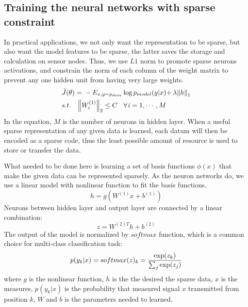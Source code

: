 \subsection{Training the neural networks with sparse constraint}
In practical applications, we not only want the representation to be sparse, but also want the model features to be sparse, the latter saves the storage and calculation on sensor nodes. Thus, we use $L1$ norm to promote sparse neurons activations, and constrain the norm of each column of the weight matrix to prevent any one hidden unit from having very large weights.
\begin{equation}
\begin{split}
&\tilde J(\theta ){\kern 1pt} {\kern 1pt} {\kern 1pt} {\rm{ = }}{\kern 1pt} {\kern 1pt} {\kern 1pt}  - {E_{x,y \sim {p_{data}}}}\log {p_{model}}(y|x){\rm{ + }}{\kern 1pt} {\kern 1pt} \lambda {\left\| h \right\|_1}\\
& s.t.{\kern 1pt} {\kern 1pt} {\kern 1pt} {\kern 1pt} {\kern 1pt} {\kern 1pt} {\kern 1pt} {\kern 1pt} {\kern 1pt} {\kern 1pt} {\left\| {{W^{(1)}_i}} \right\|_2} \le C{\kern 1pt} {\kern 1pt} {\kern 1pt} {\kern 1pt} {\kern 1pt} {\kern 1pt} {\kern 1pt} {\kern 1pt} {\kern 1pt} \forall {\kern 1pt} i = 1, \cdots ,M\\
\end{split}
\end{equation}
In the equation, $M$ is the number of neurons in hidden layer.
When a useful sparse representation of any given data is learned, each datum will then be encoded as a sparse code, thus the least possible amount of resource is used to store or transfer the data.

What needed to be done here is learning a set of basis functions $\phi(x)$ that make the given data can be represented sparsely.
As the neuron networks do, we use a linear model with nonlinear function to fit the basis functions.
\begin{equation}
h = g(W^{(1)}x + b^{(1)})
\end{equation}
Neurons between hidden layer and output layer are connected by a linear combination:
\begin{equation}
z = {W^{(2)T}}h + {b^{(2)}}
\end{equation}
The output of the model is normalized by $softmax$ function, which is a common choice for multi-class classification task\cite{bishop2006pattern}:
\begin{equation}
p({y_k}|x) = softmax {(z)_k} = {{\exp ({z_k})} \over {\sum\nolimits_j {\exp ({z_j})} }}
\end{equation}
where $g$ is the nonlinear function, $h$ is the the desired the sparse data, $x$ is the measures, $p({y_k}|x)$ is the probability that measured signal $x$ transmitted from position $k$, $W$ and $b$ is the parameters needed to learned.

